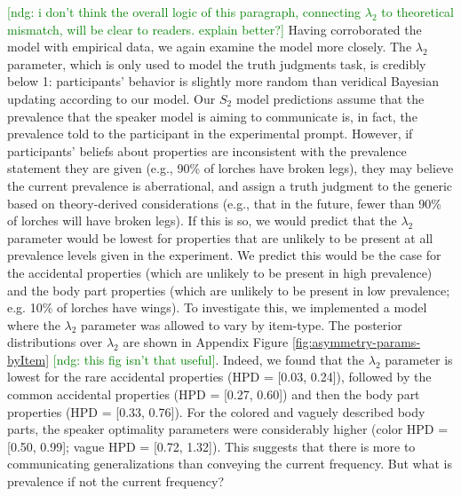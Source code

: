 \documentclass[12pt,letterpaper]{article}
\newcommand{\ndg}[1]{\textcolor{Green}{[ndg: #1]}}
\begin{document}
\ndg{i don't think the overall logic of this paragraph, connecting $\lambda_2$ to theoretical mismatch, will be clear to readers. explain better?}
Having corroborated the model with empirical data, we again examine the model more closely.
The $\lambda_2$ parameter, which is only used to model the truth judgments task, is credibly below 1: participants' behavior is slightly more random than veridical Bayesian updating according to our model.
Our $S_2$ model predictions assume that the prevalence that the speaker model is aiming to communicate is, in fact, the prevalence told to the participant in the experimental prompt.
However, if participants' beliefs about properties are inconsistent with the prevalence statement they are given (e.g., 90\% of lorches have broken legs), they may believe the current prevalence is aberrational, and assign a truth judgment to the generic based on theory-derived considerations (e.g., that in the future, fewer than 90\% of lorches will have broken legs).
If this is so, we would predict that the $\lambda_2$ parameter would be lowest for properties that are unlikely to be present at all prevalence levels given in the experiment.
We predict this would be the case for the accidental properties (which are unlikely to be present in high prevalence) and the body part properties (which are unlikely to be present in low prevalence; e.g. 10\% of lorches have wings).
To investigate this, we implemented a model where the $\lambda_2$ parameter was allowed to vary by item-type.
The posterior distributions over $\lambda_2$ are shown in Appendix Figure \ref{fig:asymmetry-params-byItem} \ndg{this fig isn't that useful}.
Indeed, we found that the $\lambda_2$ parameter is lowest for the rare accidental properties (HPD = [0.03, 0.24]), followed by the common accidental properties (HPD = [0.27, 0.60]) and then the body part properties (HPD = [0.33, 0.76]).
For the colored and vaguely described body parts, the speaker optimality parameters were considerably higher (color HPD = [0.50, 0.99]; vague HPD = [0.72, 1.32]).
This suggests that there is more to communicating generalizations than conveying the current frequency. %
But what is prevalence if not the current frequency?


%
\end{document}
